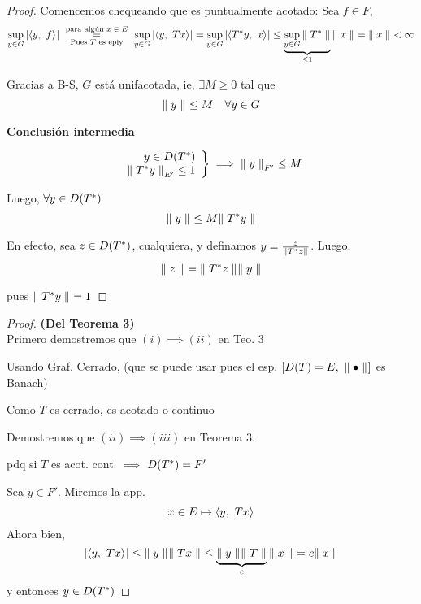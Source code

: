 \begin{proof}
Comencemos chequeando que es puntualmente acotado: Sea $f \in F$, $$
\sup_{y\in G} \abs{ \prodint[]{y}{f} }
\ \underset{\text{Pues $T$ es epiy}}{\overset{\text{para algún $x\in E$}}{=}}  \
\sup_{y\in G}\abs{ \prodint[]{y}{Tx} } 
= \sup_{y \in G} \abs{ \prodint[]{T\adj y}{x} }
\leq \underbrace{\sup_{y \in G} \norm[]{T\adj}}_{\leq 1}  \norm[]{x}
= \norm[]{x}
< \infty
$$

Gracias a B-S, $G$ está unif\mte acotada, ie, $\exists M \geq 0$ tal que $$
\norm[]{y} \leq M\quad \forall y \in G
$$

\textbf{Conclusión intermedia}

\begin{equation}\label{eqn:concl-int}
\left.
\begin{array}{r}
     y \in D(T\adj)\\
     \norm[E']{T\adj y} \leq 1
\end{array}\right \}
\implies \norm[F']{y} \leq M
\end{equation}

Luego, $\forall y \in D(T\adj)$ $$
\norm[]{y} \leq M \norm[]{T\adj y}
$$

En efecto, sea $z \in D(T\adj )$, cualquiera, y definamos $y = \frac{z}{\norm[]{T\adj z}}$. Luego, $$
\norm[]{z} = \norm[]{T\adj z} \norm[]{y}
$$

pues $\norm[]{T\adj y} = 1$

\end{proof}

\begin{proof} \textbf{(Del Teorema 3)}\\
Primero demostremos que $(i) \implies (ii)$ en Teo. 3

Usando Graf. Cerrado, (que se puede usar pues el esp. $[D(T)=E,\ \norm[]{\bullet}]$ es Banach)

Como $T$ es cerrado, es acotado o continuo

Demostremos que $(ii)\implies (iii)$ en Teorema 3.

pdq si $T$ es acot. cont. $\implies$ $D(T\adj) = F'$

Sea $y \in F'$. Miremos la app. $$
x\in E \mapsto \prodint[]{y}{Tx}
$$ Ahora bien, $$
\abs{ \prodint[]{y}{Tx} } 
\leq \norm[]{y} \norm[]{Tx}
\leq \underbrace{ \norm[]{y} \norm[]{T}}_{c} \norm[]{x} 
= c \norm[]{x}
$$ y entonces $y \in D(T\adj)$



\end{proof}



